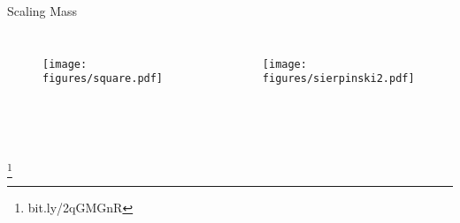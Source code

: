 \documentclass[10pt]{beamer}
\newcommand\blfootnote[1]{%
  \begingroup
  \renewcommand\thefootnote{}\footnote{#1}%
  \addtocounter{footnote}{-1}%
  \endgroup
}
\begin{document}
\begin{frame}{Scaling Mass}
    \begin{columns}[c]
        \column{1.5in}
        \begin{figure}[h!]
            \centering
            \texttt{[image: figures/square.pdf]}
        \end{figure}
    \column{1.5in}
        \begin{figure}[h!]
            \centering
            \texttt{[image: figures/sierpinski2.pdf]}
        \end{figure}
    \end{columns}
    \begin{columns}[c]
        \column{1.5in}
            \begin{align*}
            \end{align*}
        \column{1.5in}
            \begin{align*}
            \end{align*}
    \end{columns}
    \blfootnote{bit.ly/2qGMGnR}
\end{frame}
\end{document}
